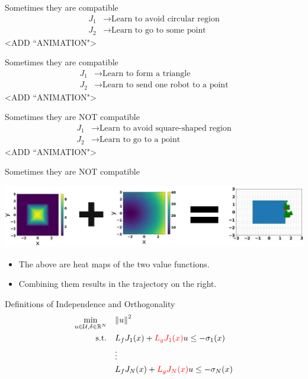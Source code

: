 \begin{frame}{Sometimes they are compatible}
	\begin{align*}
		{J}_1 &\rightarrow \textrm{Learn to avoid circular region} \\
		{J}_2 &\rightarrow \textrm{Learn to go to some point}
	\end{align*}
	<ADD ``ANIMATION">
\end{frame}

\begin{frame}{Sometimes they are compatible}
	\begin{align*}
		{J}_1 &\rightarrow \textrm{Learn to form a triangle} \\
		{J}_2 &\rightarrow \textrm{Learn to send one robot to a point}
	\end{align*}
	<ADD ``ANIMATION">
\end{frame}

\begin{frame}{Sometimes they are NOT compatible}
	\begin{align*}
		{J}_1 &\rightarrow \textrm{Learn to avoid square-shaped region} \\
		{J}_2 &\rightarrow \textrm{Learn to go to a point}
	\end{align*}
	<ADD ``ANIMATION">
\end{frame}

\begin{frame}{Sometimes they are NOT compatible}
	\begin{minipage}{\textwidth}
		\centering		
		\includegraphics[width=1.\linewidth]{diagramMath}
	\end{minipage}%
	\seprule
	\begin{itemize}
		\item{The above are heat maps of the two value functions.}
		\item{Combining them results in the trajectory on the right.}
	\end{itemize}
\end{frame}

\begin{frame}{Definitions of Independence and Orthogonality}
	\begin{align*}
		\min_{u \in \mathcal{U}, \delta \in \mathbb{R}^N} \quad & { \lVert u \rVert }^2 \\
		\textrm{s.t.} \quad & L_f {J}_1 (x) + { \color{red} L_g {J}_1 (x) } u \le - \sigma_1(x) \\
                \quad & \vdots \\
		\quad & L_f {J}_N (x) + { \color{red} L_g {J}_N (x) } u \le - \sigma_N(x) \\
	\end{align*}
\end{frame}

